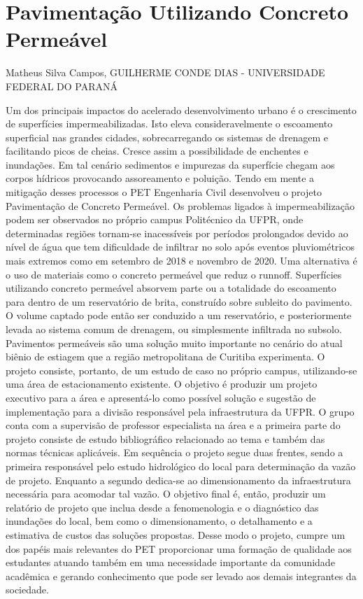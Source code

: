

\section{Pavimentação Utilizando Concreto Permeável}

Matheus Silva Campos, GUILHERME CONDE DIAS - UNIVERSIDADE FEDERAL DO PARANÁ

Um dos principais impactos do acelerado desenvolvimento urbano é o crescimento de superfícies 
impermeabilizadas. Isto eleva consideravelmente o escoamento superficial nas grandes cidades, 
sobrecarregando os sistemas de drenagem e facilitando picos de cheias. Cresce assim a 
possibilidade de enchentes e inundações. Em tal cenário sedimentos e impurezas da superfície 
chegam aos corpos hídricos provocando assoreamento e poluição. Tendo em mente a mitigação 
desses processos o PET Engenharia Civil desenvolveu o projeto Pavimentação de Concreto 
Permeável. Os problemas ligados à impermeabilização podem ser observados no próprio campus 
Politécnico da UFPR, onde determinadas regiões tornam-se inacessíveis por períodos prolongados 
devido ao nível de água que tem dificuldade de infiltrar no solo após eventos pluviométricos mais 
extremos como em setembro de 2018 e novembro de 2020. Uma alternativa é o uso de materiais 
como o concreto permeável que reduz o runnoff. Superfícies utilizando concreto permeável 
absorvem parte ou a totalidade do escoamento para dentro de um reservatório de brita, construído 
sobre subleito do pavimento. O volume captado pode então ser conduzido a um reservatório, e 
posteriormente levada ao sistema comum de drenagem, ou simplesmente infiltrada no subsolo. 
Pavimentos permeáveis são uma solução muito importante no cenário do atual biênio de estiagem 
que a região metropolitana de Curitiba experimenta. O projeto consiste, portanto, de um estudo de 
caso no próprio campus, utilizando-se uma área de estacionamento existente. O objetivo é produzir 
um projeto executivo para a área e apresentá-lo como possível solução e sugestão de 
implementação para a divisão responsável pela infraestrutura da UFPR. O grupo conta com a 
supervisão de professor especialista na área e a primeira parte do projeto consiste de estudo 
bibliográfico relacionado ao tema e também das normas técnicas aplicáveis. Em sequência o 
projeto segue duas frentes, sendo a primeira responsável pelo estudo hidrológico do local para 
determinação da vazão de projeto. Enquanto a segundo dedica-se ao dimensionamento da 
infraestrutura necessária para acomodar tal vazão. O objetivo final é, então, produzir um relatório 
de projeto que inclua desde a fenomenologia e o diagnóstico das inundações do local, bem como 
o dimensionamento, o detalhamento e a estimativa de custos das soluções propostas. Desse modo 
o projeto, cumpre um dos papéis mais relevantes do PET proporcionar uma formação de qualidade 
aos estudantes atuando também em uma necessidade importante da comunidade acadêmica e 
gerando conhecimento que pode ser levado aos demais integrantes da sociedade.


